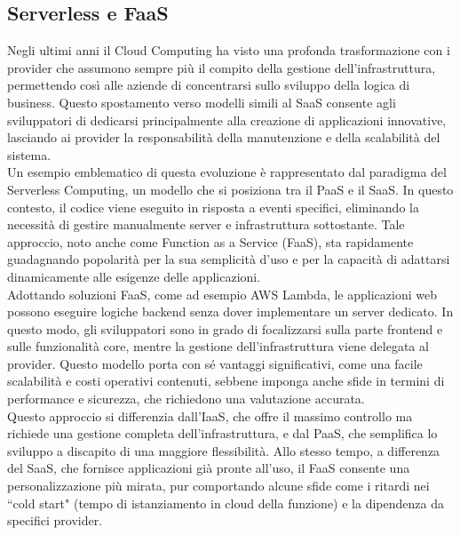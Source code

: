 
\subsection{Serverless e FaaS}

Negli ultimi anni il Cloud Computing ha visto una profonda trasformazione con i provider che assumono sempre più il compito della gestione dell’infrastruttura, permettendo così alle aziende di concentrarsi sullo sviluppo della logica di business. Questo spostamento verso modelli simili al SaaS consente agli sviluppatori di dedicarsi principalmente alla creazione di applicazioni innovative, lasciando ai provider la responsabilità della manutenzione e della scalabilità del sistema.\\
Un esempio emblematico di questa evoluzione è rappresentato dal paradigma del Serverless Computing, un modello che si posiziona tra il PaaS e il SaaS. In questo contesto, il codice viene eseguito in risposta a eventi specifici, eliminando la necessità di gestire manualmente server e infrastruttura sottostante. Tale approccio, noto anche come Function as a Service (FaaS), sta rapidamente guadagnando popolarità per la sua semplicità d’uso\cite{Wen2022Rise} e per la capacità di adattarsi dinamicamente alle esigenze delle applicazioni.\\
Adottando soluzioni FaaS, come ad esempio AWS Lambda, le applicazioni web possono eseguire logiche backend senza dover implementare un server dedicato. In questo modo, gli sviluppatori sono in grado di focalizzarsi sulla parte frontend e sulle funzionalità core, mentre la gestione dell’infrastruttura viene delegata al provider. Questo modello porta con sé vantaggi significativi, come una facile scalabilità e costi operativi contenuti, sebbene imponga anche sfide in termini di performance e sicurezza, che richiedono una valutazione accurata\cite{Li2023Serverless}.\\
Questo approccio si differenzia dall'IaaS, che offre il massimo controllo ma richiede una gestione completa dell'infrastruttura, e dal PaaS, che semplifica lo sviluppo a discapito di una maggiore flessibilità. Allo stesso tempo, a differenza del SaaS, che fornisce applicazioni già pronte all'uso, il FaaS consente una personalizzazione più mirata, pur comportando alcune sfide come i ritardi nei ``cold start" (tempo di istanziamento in cloud della funzione)\cite{Yussupov2020FaaSten} e la dipendenza da specifici provider.

